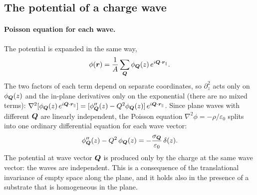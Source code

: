 \documentclass[10pt,a4paper]{paper}
\begin{document}
\subsection{The potential of a charge wave}
\label{sec:potential_wave}

\paragraph{Poisson equation for each wave.} The potential is expanded in the same way,
\begin{equation}
\phi(\bm{r}) = \frac{1}{A}\sum_{\bm{Q}}\phi_{\bm{Q}}(z)\,e^{i\bm{Q}\cdot\bm{r}_{\parallel}} .
\end{equation}
The two factors of each term depend on separate coordinates, so $\partial_z^2$ acts only on $\phi_{\bm{Q}}(z)$ and the
in-plane derivatives only on the exponential (there are no mixed terms):
$\nabla^2[\phi_{\bm{Q}}(z)\,e^{i\bm{Q}\cdot\bm{r}_{\parallel}}] = [\phi''_{\bm{Q}}(z) - Q^2\phi_{\bm{Q}}(z)]\,e^{i\bm{Q}\cdot\bm{r}_{\parallel}}$. Since plane
waves with different $\bm{Q}$ are linearly independent, the Poisson equation $\nabla^2\phi = -\rho/\varepsilon_0$ splits
into one ordinary differential equation for each wave vector:
\begin{equation}
\phi''_{\bm{Q}}(z) - Q^2\,\phi_{\bm{Q}}(z) = -\frac{\sigma_{\bm{Q}}}{\varepsilon_0}\,\delta(z) .
\label{eq:poisson_Q}
\end{equation}
The potential at wave vector $\bm{Q}$ is produced only by the charge at the same wave vector: the waves are independent.
This is a consequence of the translational invariance of empty space along the plane, and it holds also in the
presence of a substrate that is homogeneous in the plane.
\end{document}
